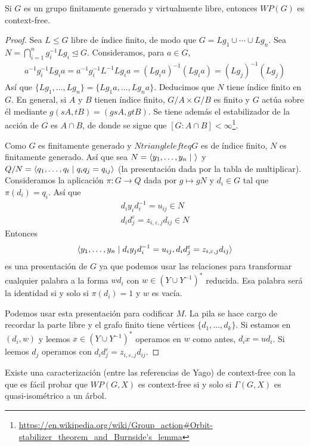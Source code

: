 \documentclass[twoside, 11pt]{article}
\begin{document}
\begin{lemma}
Si $G$ es un grupo finitamente generado y virtualmente libre, entonces $WP(G)$ es context-free. 
\end{lemma}
\begin{proof}
Sea $L\leq G$ libre de índice finito, de modo que $G=Lg_1\cup\cdots\cup Lg_n$. Sea $N=\bigcap_{i=1}^n g_i^{-1}Lg_i\trianglelefteq G$. Consideramos, para $a\in G$,
\begin{gather*}
a^{-1}g_i^{-1}Lg_ia=a^{-1}g_i^{-1}L^{-1}Lg_ia=(Lg_ia)^{-1}(Lg_ia)=(Lg_j)^{-1}(Lg_j)
\end{gather*}
Así que $\{Lg_1,\dots, Lg_n\}=\{Lg_1a,\dots, Lg_na\}$. Deducimos que $N$ tiene índice finito en $G$. En general, si $A$ y $B$ tienen índice finito, $G/A\times G/B$ es finito y $G$ actúa sobre él mediante $g(sA,tB)=(gsA,gtB)$. Se tiene además el estabilizador de la acción de $G$ es $A\cap B$, de donde se sigue que $[G:A\cap B]<\infty$\footnote{\url{https://en.wikipedia.org/wiki/Group_action\#Orbit-stabilizer_theorem_and_Burnside's_lemma}}.

Como $G$ es finitamente generado y $Ntrianglelefteq G$ es de índice finito, $N$ es finitamente generado. Así que sea $N=\langle{y_1,\dots, y_n\mid\ }\rangle$ y $Q/N=\langle{q_1,\dots, q_t\mid q_iq_j=q_{ij}}\rangle$ (la presentación dada por la tabla de multiplicar). Consideramos la aplicación $\pi: G\to Q$ dada por $g\mapsto gN$ y $d_i\in G$ tal que $\pi(d_i)=q_i$. Así que 
\begin{gather*}
d_iy_id_i^{-1}=u_{ij}\in N\\
d_id_j^{\varepsilon}=z_{i,\varepsilon,j}d_{ij}\in N
\end{gather*}
Entonces 
\[
\langle{y_1,\dots, y_n\mid d_iy_jd_i^{-1}=u_{ij}, d_id_j^{\varepsilon}=z_{i,\varepsilon,j}d_{ij}}\rangle
\]
es una presentación de $G$ ya que podemos usar las relaciones para transformar cualquier palabra a la forma $wd_i$ con $w\in (Y\cup Y^{-1})^*$ reducida. Esa palabra será la identidad si y solo si $\pi(d_i)=1$ y $w$ es vacía. 

Podemos usar esta presentación para codificar $M$. La pila se hace cargo de recordar la parte libre y el grafo finito tiene vértices $\{d_1,\dots, d_k\}$. Si estamos en $(d_i,w)$ y leemos $x\in (Y\cup Y^{-1})^*$ operamos en $w$ como antes, $d_ix=ud_i$. Si leemos $d_j$ operamos con $d_id_j^{\varepsilon}=z_{i,\varepsilon,j}d_{ij}$.
\end{proof}

Existe una caracterización (entre las referencias de Yago) de context-free con la que es fácil probar que $WP(G,X)$ es context-free si y solo si $\Gamma(G,X)$ es quasi-isométrico a un árbol. 
\end{document}
